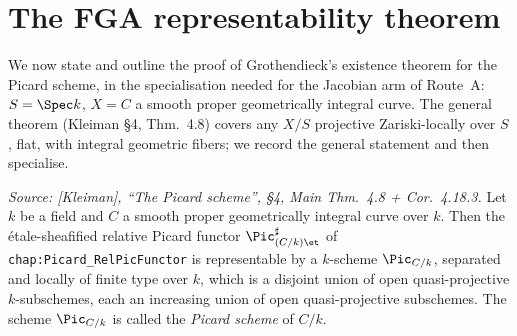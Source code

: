 \section{The FGA representability theorem}
\label{sec:fga_pic_representability}

We now state and outline the proof of Grothendieck's existence theorem
for the Picard scheme, in the specialisation needed for the Jacobian arm
of Route~A: \(S = \Spec k\), \(X = C\) a smooth proper geometrically integral
curve. The general theorem (Kleiman \S 4, Thm.~4.8) covers any
\(X/S\) projective Zariski-locally over \(S\), flat, with integral geometric
fibers; we record the general statement and then specialise.

\begin{theorem}
  \label{thm:fga_pic_representability}
  \textit{Source: [Kleiman], ``The Picard scheme'', \S 4, Main Thm.~4.8
  + Cor.~4.18.3.}
  Let \(k\) be a field and \(C\) a smooth proper geometrically integral curve
  over \(k\). Then the \'etale-sheafified relative Picard functor
  \(\Pic^\sharp_{(C/k)\et}\) of \texttt{chap:Picard\_RelPicFunctor} is
  representable by a \(k\)-scheme \(\Pic_{C/k}\), separated and locally of
  finite type over \(k\), which is a disjoint union of open
  quasi-projective \(k\)-subschemes, each an increasing union of open
  quasi-projective subschemes. The scheme \(\Pic_{C/k}\) is called the
  \emph{Picard scheme} of \(C/k\).
\end{theorem}

